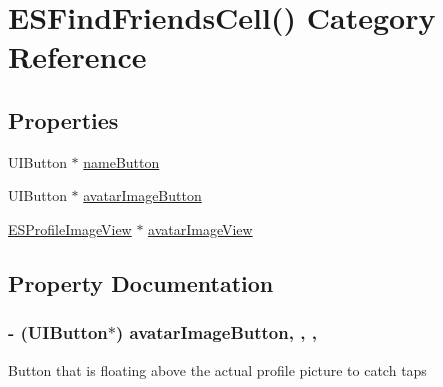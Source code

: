 \hypertarget{category_e_s_find_friends_cell_07_08}{}\section{E\+S\+Find\+Friends\+Cell() Category Reference}
\label{category_e_s_find_friends_cell_07_08}
\subsection*{Properties}
\begin{DoxyCompactItemize}
\item 
U\+I\+Button $\ast$ \hyperlink{category_e_s_find_friends_cell_07_08_a620523864206c5b5b2925b7e2409723e}{name\+Button}
\item 
U\+I\+Button $\ast$ \hyperlink{category_e_s_find_friends_cell_07_08_a5f0e31fcc86c99f3f4030f3094ee74f6}{avatar\+Image\+Button}
\item 
\hyperlink{interface_e_s_profile_image_view}{E\+S\+Profile\+Image\+View} $\ast$ \hyperlink{category_e_s_find_friends_cell_07_08_abc768c8e3be189641cb1e8148bb9d060}{avatar\+Image\+View}
\end{DoxyCompactItemize}


\subsection{Property Documentation}
\hypertarget{category_e_s_find_friends_cell_07_08_a5f0e31fcc86c99f3f4030f3094ee74f6}{}
\subsubsection[{avatar\+Image\+Button}]{\setlength{\rightskip}{0pt plus 5cm}-\/ (U\+I\+Button$\ast$) avatar\+Image\+Button\hspace{0.3cm}{\ttfamily [read]}, {\ttfamily [write]}, {\ttfamily [nonatomic]}, {\ttfamily [strong]}}\label{category_e_s_find_friends_cell_07_08_a5f0e31fcc86c99f3f4030f3094ee74f6}
Button that is floating above the actual profile picture to catch taps \hypertarget{category_e_s_find_friends_cell_07_08_abc768c8e3be189641cb1e8148bb9d060}{}
